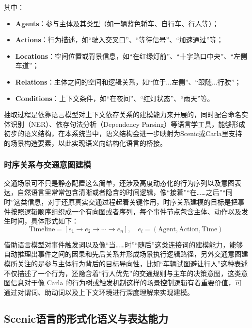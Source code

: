 其中：
\begin{itemize}
	\item \textbf{Agents}：参与主体及其类型（如一辆蓝色轿车、自行车、行人等）；
	\item \textbf{Actions}：行为描述，如“驶入交叉口”、“等待信号”、“加速通过”等；
	\item \textbf{Locations}：空间位置或背景信息，如“在红绿灯前”、“十字路口中央”、“左侧车道”；
	\item \textbf{Relations}：主体之间的空间和逻辑关系，如“位于...左侧”、“跟随...行驶”；
	\item \textbf{Conditions}：上下文条件，如“在夜间”、“红灯状态”、“雨天”等。
\end{itemize}

抽取过程是依靠语言模型对上下文依存关系的建模能力来开展的，同时配合命名实体识别（NER）、依存句法分析（Dependency Parsing）等语言学工具，能够形成初步的语义结构，在本系统当中，语义结构会进一步映射为Scenic或Carla里支持的场景构造要素，以此实现语义向结构化语言的桥接。

\subsubsection{时序关系与交通意图建模}

交通场景可不只是静态配置这么简单，还涉及高度动态化的行为序列以及意图表达，自然语言里常常包含清晰或者隐含的时间逻辑，像“接着”“在……之后”“同时”这类信息，对于还原真实交通过程起着关键作用，时序关系建模的目标是把事件按照逻辑顺序组织成一个有向图或者序列，每个事件节点包含主体、动作以及发生时间，具体形式如下：
\begin{equation}
	\text{Timeline} = \left[ e_1 \rightarrow e_2 \rightarrow \cdots \rightarrow e_n \right], \quad e_i = (\text{Agent}, \text{Action}, \text{Time})
\end{equation}

借助语言模型对事件触发词以及像“当……时”“随后”这类连接词的建模能力，能够自动推理出事件之间的因果和先后关系并形成场景执行逻辑路径，另外交通意图建模所关注的是参与主体行为背后的目标导向性，比如“车辆试图避让行人”这种表述不仅描述了一个行为，还隐含着“行人优先”的交通规则与主车的决策意图，这类意图信息对于像 Carla 的行为树或触发机制这样的场景控制逻辑有着重要价值，可通过对谓词、助动词以及上下文环境进行深度理解来实现建模。

\subsection{Scenic语言的形式化语义与表达能力}


